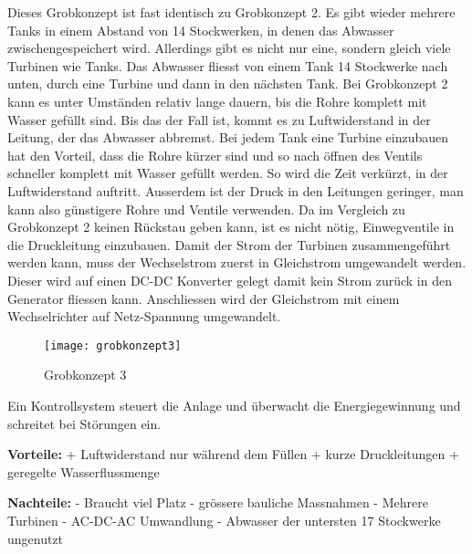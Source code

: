 Dieses Grobkonzept ist fast identisch zu Grobkonzept 2. Es gibt wieder mehrere Tanks in einem Abstand von 14 Stockwerken, in denen das Abwasser zwischengespeichert wird. Allerdings gibt es nicht nur eine, sondern gleich viele Turbinen wie Tanks. Das Abwasser fliesst von einem Tank 14 Stockwerke nach unten, durch eine Turbine und dann in den nächsten Tank. Bei Grobkonzept 2 kann es unter Umständen relativ lange dauern, bis die Rohre komplett mit Wasser gefüllt sind. Bis das der Fall ist, kommt es zu Luftwiderstand in der Leitung, der das Abwasser abbremst. Bei jedem Tank eine Turbine einzubauen hat den Vorteil, dass die Rohre kürzer sind und so nach öffnen des Ventils schneller komplett mit Wasser gefüllt werden. So wird die Zeit verkürzt, in der Luftwiderstand auftritt. Ausserdem ist der Druck in den Leitungen geringer, man kann also günstigere Rohre und Ventile verwenden. Da im Vergleich zu Grobkonzept 2 keinen Rückstau geben kann, ist es nicht nötig, Einwegventile in die Druckleitung einzubauen. 
Damit der Strom der Turbinen zusammengeführt werden kann, muss der Wechselstrom zuerst in Gleichstrom umgewandelt werden. Dieser wird auf einen DC-DC Konverter gelegt damit kein Strom zurück in den Generator fliessen kann. Anschliessen wird der Gleichstrom mit einem Wechselrichter auf Netz-Spannung umgewandelt.
\newpage

\begin{wrapfigure}{r}{0.5\textwidth}
  \begin{center}
    \texttt{[image: grobkonzept3]}
  \end{center}
  \caption{Grobkonzept 3}
\end{wrapfigure}


 Ein Kontrollsystem steuert die Anlage und überwacht die Energiegewinnung und schreitet bei Störungen ein.

\textbf{Vorteile:} 									\newline
+	Luftwiderstand nur während dem Füllen			\newline
+	kurze Druckleitungen								\newline
+	geregelte Wasserflussmenge						\newline

\textbf{Nachteile:}									\newline
-	Braucht viel Platz								\newline
-	grössere bauliche Massnahmen						\newline
-	Mehrere Turbinen									\newline
-	AC-DC-AC Umwandlung								\newline
-	Abwasser der untersten 17 Stockwerke ungenutzt	\newline
\WFclear			
\newpage